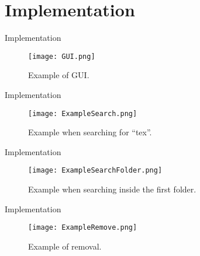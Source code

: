 \section{Implementation}
\begin{frame}{Implementation}
	\begin{figure}[H]
  		\centering
  		\texttt{[image: GUI.png]}
  		\caption{Example of GUI.}
	\end{figure}
\end{frame}
\begin{frame}{Implementation}
	\begin{figure}[H]
  		\centering
  		\texttt{[image: ExampleSearch.png]}
  		\caption{Example when searching for ``tex''.}
	\end{figure}
\end{frame}
\begin{frame}{Implementation}
	\begin{figure}[H]
  		\centering
  		\texttt{[image: ExampleSearchFolder.png]}
  		\caption{Example when searching inside the first folder.}
	\end{figure}
\end{frame}
\begin{frame}{Implementation}
  \begin{figure}
      \centering
      \texttt{[image: ExampleRemove.png]}
      \caption{Example of removal.}
  \end{figure}
\end{frame}